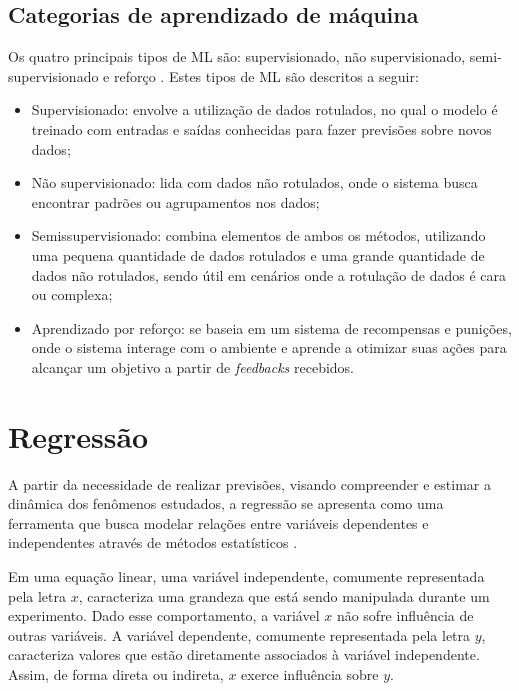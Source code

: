 \subsection{Categorias de aprendizado de máquina}

Os quatro principais tipos de \gls{ML} são: supervisionado, não supervisionado, semi-supervisionado e reforço \cite{saravanan2018}. Estes tipos de \gls{ML} são descritos a seguir:

\begin{itemize}
    \item Supervisionado: envolve a utilização de dados rotulados, no qual o modelo é treinado com entradas e saídas conhecidas para fazer previsões sobre novos dados;
    \item Não supervisionado: lida com dados não rotulados, onde o sistema busca encontrar padrões ou agrupamentos nos dados;
    \item Semissupervisionado: combina elementos de ambos os métodos, utilizando uma pequena quantidade de dados rotulados e uma grande quantidade de dados não rotulados, sendo útil em cenários onde a rotulação de dados é cara ou complexa;
    \item Aprendizado por reforço: se baseia em um sistema de recompensas e punições, onde o sistema interage com o ambiente e aprende a otimizar suas ações para alcançar um objetivo a partir de \textit{feedbacks} recebidos.
\end{itemize}

\section{Regressão}

A partir da necessidade de realizar previsões, visando compreender e estimar a dinâmica dos fenômenos estudados, a regressão se apresenta como uma ferramenta que busca modelar relações entre variáveis dependentes e independentes através de métodos estatísticos \cite{soto2013}.

Em uma equação linear, uma variável independente, comumente representada pela letra $x$, caracteriza uma grandeza que está sendo manipulada durante um experimento. Dado esse comportamento, a variável $x$ não sofre influência de outras variáveis. A variável dependente, comumente representada pela letra $y$, caracteriza valores que estão diretamente associados à variável independente. Assim, de forma direta ou indireta, $x$ exerce influência sobre $y$.

